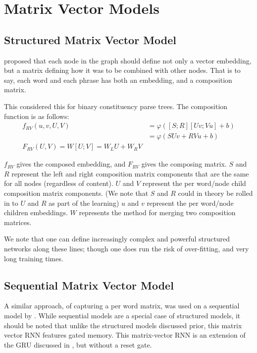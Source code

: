 \documentclass[12pt,parskip]{komatufte}
\begin{document}
\section{Matrix Vector Models}\label{sec:matrix-vector-models}
\subsection{Structured Matrix Vector Model}

 proposed that each node in the graph should define not only a vector embedding, but a matrix defining how it was to be combined with other nodes.
That is to say, each word and each phrase has both an embedding, and a composition matrix.

This considered this for binary constituency parse trees.
The composition function is as follows:
\begin{align}
f_{RV}(u, v, U, V) &= \varphi\left( [S;R][Uv;Vu] + b \right) \\ 
&= \varphi\left( SUv +RVu + b \right)\\
F_{RV}(U, V) = W[U;V] = W_L U + W_R V
\end{align}


$f_{RV}$ gives the composed embedding, and $F_{RV}$ gives the composing matrix.
$S$ and $R$ represent the left and right composition matrix components that are the same for all nodes (regardless of content).
$U$ and $V$ represent the per word/node child composition matrix components.
(We note that $S$ and $R$ could in theory be rolled in to $U$ and $R$ as part of the learning)
$u$ and $v$ represent the per word/node children embeddings.
$W$ represents the method for merging two composition matrices.

We note that one can define increasingly complex and powerful structured networks along these lines; though one does run the risk of over-fitting, and very long training times.

\subsection{Sequential Matrix Vector Model}
A similar approach, of capturing a per word matrix, 
was used on a sequential model by .
While sequential models are a special case of structured models,
it should be noted that unlike the structured models discussed prior,
this matrix vector RNN features gated memory.
This matrix-vector RNN is an extension of the GRU discussed in , but without a reset gate.
\end{document}
